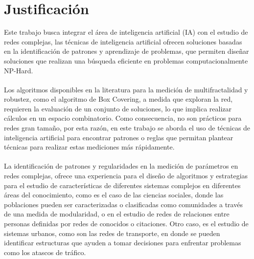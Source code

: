 \section{Justificación}


Este trabajo busca integrar el área de inteligencia artificial (IA) con el estudio de redes complejas, las técnicas de inteligencia artificial ofrecen soluciones basadas en la identificación de patrones y aprendizaje de problemas, que permiten diseñar soluciones que realizan una búsqueda eficiente en problemas computacionalmente NP-Hard.
\\\\
Los algoritmos disponibles en la literatura para la medición de multifractalidad y robustez,
como el algoritmo de Box Covering, a medida que exploran la red, requieren la evaluación
de un conjunto de soluciones, lo que implica realizar cálculos en un espacio combinatorio.
Como consecuencia, no son prácticos para redes gran tamaño, por esta razón, en este trabajo
se aborda el uso de técnicas de inteligencia artificial para encontrar patrones o reglas que
permitan plantear técnicas para realizar estas mediciones más rápidamente.
\\\\
La identificación de patrones y regularidades en la medición de parámetros en redes complejas, ofrece una experiencia para el diseño de algoritmos y estrategias para el estudio de
características de diferentes sistemas complejos en diferentes áreas del conocimiento, como es
el caso de las ciencias sociales, donde las poblaciones pueden ser caracterizadas o clasificadas como comunidades a través de una medida de modularidad, o en el estudio de redes de relaciones entre personas definidas por redes de conocidos o citaciones. Otro caso, es el estudio de sistemas urbanos, como son las redes de transporte, en donde se pueden identificar estructuras que ayuden a tomar decisiones para enfrentar problemas como los atascos de tráfico.





